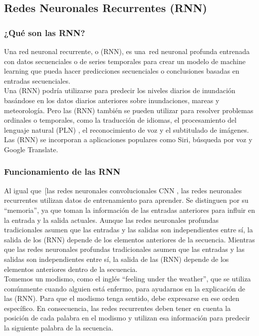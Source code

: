 \documentclass{article}
\begin{document}
\newpage

\subsection{Redes Neuronales Recurrentes (RNN)}
\subsubsection{¿Qué son las RNN?}
Una red neuronal recurrente, o (RNN), es una red neuronal \cite{ibm-nn} profunda entrenada con datos secuenciales o de series temporales para crear un modelo de machine learning \cite{ibm-ml} que pueda hacer predicciones secuenciales o conclusiones basadas en entradas secuenciales. \\

Una (RNN) podría utilizarse para predecir los niveles diarios de inundación basándose en los datos diarios anteriores sobre inundaciones, mareas y meteorología.
Pero las (RNN) también se pueden utilizar para resolver problemas ordinales o temporales, como la traducción de idiomas, el procesamiento del lenguaje natural (PLN) \cite{ibm-pln}, el reconocimiento de voz \cite{ibm-sr} y el subtitulado de imágenes.
Las (RNN) se incorporan a aplicaciones populares como Siri, búsqueda por voz y Google Translate.

\subsubsection{Funcionamiento de las RNN}
Al igual que [las redes neuronales convolucionales CNN \cite{ibm-cnn}, las redes neuronales recurrentes utilizan datos de entrenamiento para aprender.
Se distinguen por su ``memoria'', ya que toman la información de las entradas anteriores para influir en la entrada y la salida actuales.
Aunque las redes neuronales profundas tradicionales asumen que las entradas y las salidas son independientes entre sí, la salida de los (RNN) depende de los elementos anteriores de la secuencia.
Mientras que las redes neuronales profundas tradicionales asumen que las entradas y las salidas son independientes entre sí, la salida de las (RNN) depende de los elementos anteriores dentro de la secuencia. \\

Tomemos un modismo, como el inglés ``feeling under the weather'', que se utiliza comúnmente cuando alguien está enfermo, para ayudarnos en la explicación de las (RNN).
Para que el modismo tenga sentido, debe expresarse en ese orden específico.
En consecuencia, las redes recurrentes deben tener en cuenta la posición de cada palabra en el modismo y utilizan esa información para predecir la siguiente palabra de la secuencia.
\end{document}
